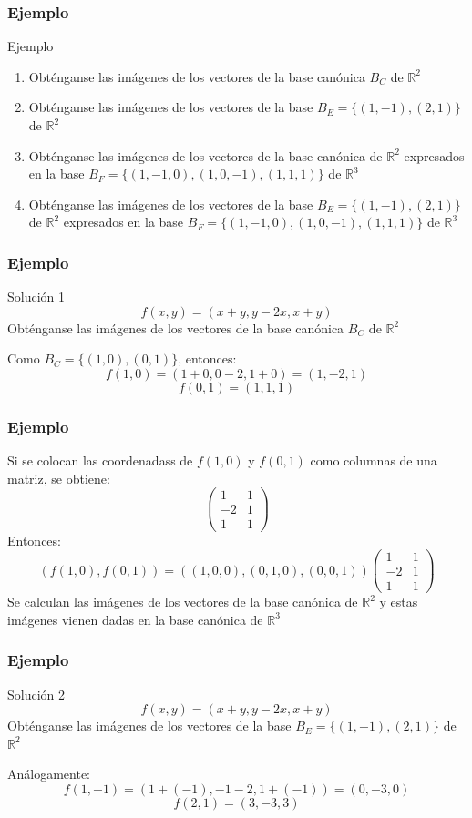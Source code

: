 \documentclass{beamer}
\begin{document}
\begin{frame}
  \frametitle{Ejemplo}
 \begin{block}{Ejemplo} 
\begin{enumerate}
\item Obt\'enganse las im\'agenes de los vectores de la base can\'onica $B_C$ de $\mathbb R^2$
\item Obt\'enganse las im\'agenes de los vectores de la base $B_E = \{(1,-1),(2,1)\}$ de $\mathbb R^2$
\item Obt\'enganse las im\'agenes de los vectores de la base can\'onica de $\mathbb R^2$ expresados en la base $B_F=\{(1,-1,0),(1,0,-1),(1,1,1)\}$ de $\mathbb R^3$
\item Obt\'enganse las im\'agenes de los vectores de la base $B_E=\{(1,-1),(2,1)\}$ de $\mathbb R^2$ expresados en la base $B_F=\{(1,-1,0),(1,0,-1),(1,1,1)\}$ de $\mathbb R^3$ 
\end{enumerate}
\end{block} 
  \end{frame}
  
    \begin{frame}
  \frametitle{Ejemplo}
 \begin{block}{Soluci\'on 1} 
$$f(x,y) = (x+y, y-2x, x+y)$$
Obt\'enganse las im\'agenes de los vectores de la base can\'onica $B_C$ de $\mathbb R^2$
 \end{block} 
 Como $B_C=\{(1,0),(0,1)\}$, entonces:
 \[f(1,0) = (1+0, 0-2, 1+0) = (1,-2,1)\]
 \[f(0,1) = (1,1,1)\]
  \end{frame}
  
      \begin{frame}
  \frametitle{Ejemplo}
Si se colocan las coordenadass de $f(1,0)$ y $f(0,1)$ como columnas de una matriz, se obtiene:
 \[\left(\begin{array}{rr}1 & 1 \\-2 & 1 \\1 & 1\end{array}\right)\]
Entonces:
 \[ (f(1,0), f(0,1)) = ((1,0,0),(0,1,0),(0,0,1)) \left(\begin{array}{rr}1 & 1 \\-2 & 1 \\1 & 1\end{array}\right)\]
  Se calculan las im\'agenes de los vectores de la base can\'onica de $\mathbb R^2$ y estas im\'agenes vienen dadas en la base can\'onica de $\mathbb R^3$
   \end{frame}
  
      \begin{frame}
  \frametitle{Ejemplo}
 \begin{block}{Soluci\'on 2} 
$$f(x,y) = (x+y, y-2x, x+y)$$
Obt\'enganse las im\'agenes de los vectores de la base $B_E = \{(1,-1),(2,1)\}$ de $\mathbb R^2$
 \end{block} 
An\'alogamente: 
 \[f(1,-1) = (1+(-1), -1-2, 1+(-1)) = (0,-3,0)\]
 \[f(2,1) = (3,-3,3)\]
  \end{frame}
  
\end{document}
